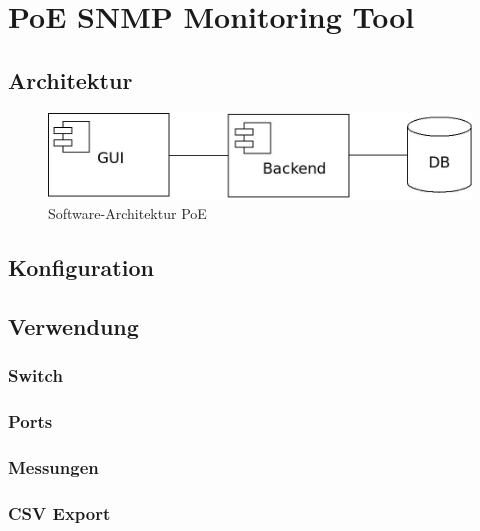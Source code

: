 \section{PoE SNMP Monitoring Tool}
\label{sec:tool}

\subsection{Architektur}

\begin{figure}[h]
    \centering
    \leavevmode
    \includegraphics[width=1.0\linewidth]{figures/architecture.jpeg}
    \caption{Software-Architektur PoE}
    \label{fig:Software-Architektue PoE}
\end{figure}


\subsection{Konfiguration}

\subsection{Verwendung}

\subsubsection{Switch}

\subsubsection{Ports}

\subsubsection{Messungen}

\subsubsection{CSV Export}
